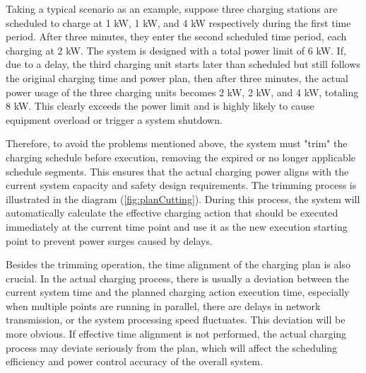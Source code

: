 \documentclass[
	english,
	ruledheaders=section,%
	class=report,%
	thesis={type=Report},%
	accentcolor=9c,%
	custommargins=true,%
	marginpar=false,%
	parskip=half-,%
	fontsize=11pt,%
	logofile={img/tuda_logo.pdf}, %
]{tudapub}
\begin{document}

Taking a typical scenario as an example, suppose three charging stations are scheduled to charge at 1 kW, 1 kW, and 4 kW respectively during the first time period. After three minutes, they enter the second scheduled time period, each charging at 2 kW. The system is designed with a total power limit of 6 kW. If, due to a delay, the third charging unit starts later than scheduled but still follows the original charging time and power plan, then after three minutes, the actual power usage of the three charging units becomes 2 kW, 2 kW, and 4 kW, totaling 8 kW. This clearly exceeds the power limit and is highly likely to cause equipment overload or trigger a system shutdown.


Therefore, to avoid the problems mentioned above, the system must "trim" the charging schedule before execution, removing the expired or no longer applicable schedule segments. This ensures that the actual charging power aligns with the current system capacity and safety design requirements. The trimming process is illustrated in the diagram (\autoref{fig:planCutting}). During this process, the system will automatically calculate the effective charging action that should be executed immediately at the current time point and use it as the new execution starting point to prevent power surges caused by delays.


Besides the trimming operation, the time alignment of the charging plan is also crucial. In the actual charging process, there is usually a deviation between the current system time and the planned charging action execution time, especially when multiple points are running in parallel, there are delays in network transmission, or the system processing speed fluctuates. This deviation will be more obvious. If effective time alignment is not performed, the actual charging process may deviate seriously from the plan, which will affect the scheduling efficiency and power control accuracy of the overall system.
\end{document}
